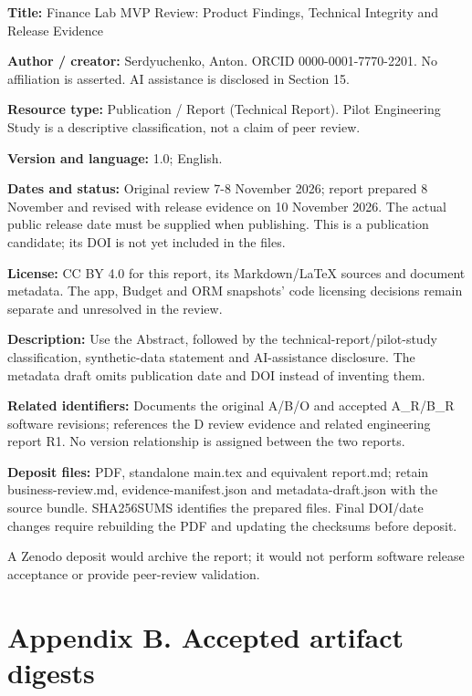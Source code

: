 \documentclass[11pt,a4paper]{article}
\begin{document}
\textbf{Title:} Finance Lab MVP Review: Product Findings, Technical Integrity and Release Evidence

\textbf{Author /\allowbreak{} creator:} Serdyuchenko, Anton. ORCID 0000-0001-7770-2201. No affiliation is asserted. AI assistance is disclosed in Section 15.

\textbf{Resource type:} Publication /\allowbreak{} Report (Technical Report). Pilot Engineering Study is a descriptive classification, not a claim of peer review.

\textbf{Version and language:} 1.0; English.

\textbf{Dates and status:} Original review 7-8 November 2026; report prepared 8 November and revised with release evidence on 10 November 2026. The actual public release date must be supplied when publishing. This is a publication candidate; its DOI is not yet included in the files.

\textbf{License:} CC BY 4.0 for this report, its Markdown/\allowbreak{}LaTeX sources and document metadata. The app, Budget and ORM snapshots' code licensing decisions remain separate and unresolved in the review.

\textbf{Description:} Use the Abstract, followed by the technical-report/\allowbreak{}pilot-study classification, synthetic-data statement and AI-assistance disclosure. The metadata draft omits publication date and DOI instead of inventing them.

\textbf{Related identifiers:} Documents the original A/\allowbreak{}B/\allowbreak{}O and accepted A\_R/\allowbreak{}B\_R software revisions; references the D review evidence and related engineering report R1. No version relationship is assigned between the two reports.

\textbf{Deposit files:} PDF, standalone main.tex and equivalent report.md; retain business-review.md, evidence-manifest.json and metadata-draft.json with the source bundle. SHA256SUMS identifies the prepared files. Final DOI/\allowbreak{}date changes require rebuilding the PDF and updating the checksums before deposit.

A Zenodo deposit would archive the report; it would not perform software release acceptance or provide peer-review validation.

\clearpage
\section*{Appendix B. Accepted artifact digests}
\end{document}
